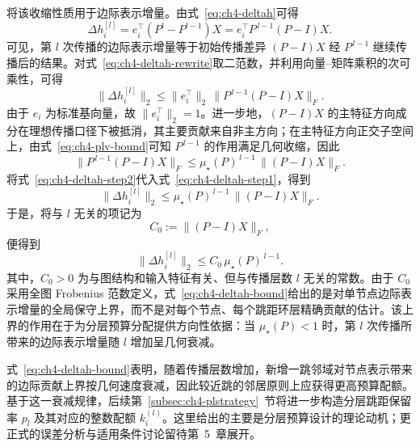 将该收缩性质用于边际表示增量。由式~\eqref{eq:ch4-deltah}可得
\begin{equation}
  \Delta h_i^{[l]}
  =
  e_i^\top(P^l-P^{l-1})X
  =
  e_i^\top P^{\,l-1}(P-I)X.
  \label{eq:ch4-deltah-rewrite}
\end{equation}
可见，第 \(l\) 次传播的边际表示增量等于初始传播差异 \((P-I)X\) 经 \(P^{\,l-1}\) 继续传播后的结果。对式~\eqref{eq:ch4-deltah-rewrite}取二范数，并利用向量--矩阵乘积的次可乘性，可得
\begin{equation}
  \|\Delta h_i^{[l]}\|_2
  \le
  \|e_i^\top\|_2\,
  \bigl\|P^{\,l-1}(P-I)X\bigr\|_F.
  \label{eq:ch4-deltah-step1}
\end{equation}
由于 \(e_i\) 为标准基向量，故 \(\|e_i^\top\|_2=1\)。进一步地，\((P-I)X\) 的主特征方向成分在理想传播口径下被抵消，其主要贡献来自非主方向；在主特征方向正交子空间上，由式~\eqref{eq:ch4-plv-bound}可知 \(P^{\,l-1}\) 的作用满足几何收缩，因此
\begin{equation}
  \bigl\|P^{\,l-1}(P-I)X\bigr\|_F
  \le
  \mu_\star(P)^{\,l-1}\,
  \|(P-I)X\|_F.
  \label{eq:ch4-deltah-step2}
\end{equation}
将式~\eqref{eq:ch4-deltah-step2}代入式~\eqref{eq:ch4-deltah-step1}，得到
\begin{equation}
  \|\Delta h_i^{[l]}\|_2
  \le
  \mu_\star(P)^{\,l-1}\,
  \|(P-I)X\|_F.
  \label{eq:ch4-deltah-step3}
\end{equation}
于是，将与 \(l\) 无关的项记为
\begin{equation}
  C_0 := \|(P-I)X\|_F,
  \label{eq:ch4-c0-def}
\end{equation}
便得到
\begin{equation}
  \|\Delta h_i^{[l]}\|_2
  \le C_0\,\mu_\star(P)^{\,l-1}.
  \label{eq:ch4-deltah-bound}
\end{equation}
其中，\(C_0>0\) 为与图结构和输入特征有关、但与传播层数 \(l\) 无关的常数。由于 \(C_0\) 采用全图 Frobenius 范数定义，式~\eqref{eq:ch4-deltah-bound}给出的是对单节点边际表示增量的全局保守上界，而不是对每个节点、每个跳距环层精确贡献的估计。该上界的作用在于为分层预算分配提供方向性依据：当 \(\mu_\star(P)<1\) 时，第 \(l\) 次传播所带来的边际表示增量随 \(l\) 增加呈几何衰减。

式~\eqref{eq:ch4-deltah-bound}表明，随着传播层数增加，新增一跳邻域对节点表示带来的边际贡献上界按几何速度衰减，因此较近跳的邻居原则上应获得更高预算配额。基于这一衰减规律，后续第~\ref{subsec:ch4-plstrategy}~节将进一步构造分层跳距保留率 \(p_l\) 及其对应的整数配额 \(k_i^{(l)}\)。这里给出的主要是分层预算设计的理论动机；更正式的误差分析与适用条件讨论留待第~5~章展开。

